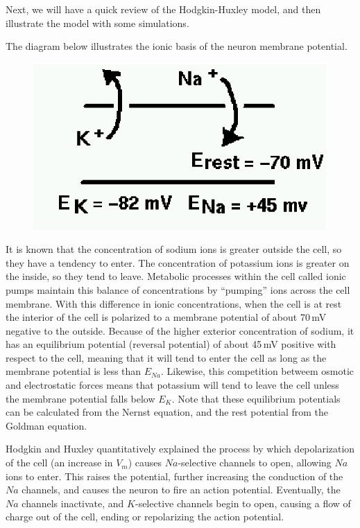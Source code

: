 \documentclass[12pt]{article}
\begin{document}
Next, we will have a quick review of the Hodgkin-Huxley model, and then illustrate the model with some simulations.

The diagram below illustrates the ionic basis of the neuron membrane potential.

\begin{figure}[h]
  \centering
 \includegraphics[scale=0.75]{figures/ionflow.eps}
  \label{fig:ionflow}
\end{figure}

It is known that the concentration of sodium ions is greater outside the cell, so they have a tendency to enter. The concentration of potassium ions is greater on the inside, so they tend to leave. Metabolic processes within the cell called ionic pumps maintain this balance of concentrations by ``pumping'' ions across the cell membrane. With this difference in ionic concentrations,  when the cell is at rest the interior of the cell is polarized to a membrane potential of about 70\,mV negative to the outside. Because of the higher exterior concentration of sodium, it has an equilibrium potential (reversal potential) of about 45\,mV positive with respect to the cell, meaning that it will tend to enter the cell as long as the membrane potential is less than $E_{Na}$. Likewise, this competition betweem osmotic and electrostatic forces means that potassium will tend to leave the cell unless the membrane potential falls below $E_K$. Note that these equilibrium potentials can be calculated from the Nernst equation, and the rest potential from the Goldman equation.

Hodgkin and Huxley quantitatively explained the process by which depolarization of the cell (an increase in $V_m$) causes $Na$-selective channels to open, allowing $Na$ ions to enter. This raises the potential, further increasing the conduction of the $Na$ channels, and causes the neuron to fire an action potential. Eventually, the $Na$ channels inactivate, and $K$-selective channels begin to open, causing a flow of charge out of the cell, ending or repolarizing the action potential.
\end{document}
